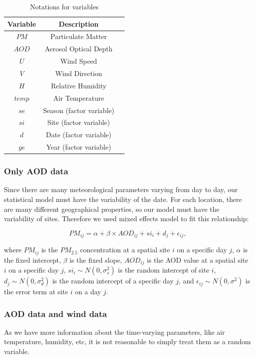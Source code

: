 \documentclass[10pt]{article}
\begin{document}
\begin{table}[H] 
\centering
\begin{tabular}{|c|c|c|}
\hline
Variable & Description \\ 
\hline
$PM$ & Particulate Matter \\
$AOD$ & Aerosol Optical Depth \\
$U$ & Wind Speed \\
$V$ & Wind Direction \\
$H$ & Relative Humidity \\
$temp$ & Air Temperature \\
$se$ & Season (factor variable)\\
$si$ & Site (factor variable)\\
$d$ & Date (factor variable)\\
$ye$ & Year (factor variable)\\
\hline
\end{tabular}
\caption{Notations for variables}
\label{variable_table}
\end{table}

\subsubsection{Only AOD data}
Since there are many meteorological parameters varying from day to day, our statistical model must have the variability of the date. For each location, there are many different geographical properties, so our model must have the variability of sites. Therefore we used mixed effects model to fit this relationship:

$$PM_{ij} = \alpha + \beta\times AOD_{ij} + si_i + d_j+ \epsilon_{ij}, $$

where $PM_{ij}$ is the $PM_{2.5}$ concentration at a spatial site $i$ on a specific day $j$, $\alpha$ is the fixed intercept, $\beta$ is the fixed slope, $AOD_{ij}$ is the AOD value at a spatial site $i$ on a specific day $j$, $si_i\sim N(0, \sigma_s^2)$ is the random intercept of site $i$, $d_j\sim N(0, \sigma_d^2)$ is the random intercept of a specific day $j$, and $\epsilon_{ij}\sim N(0, \sigma^2)$ is the error term at site $i$ on a day $j$.

\subsubsection{AOD data and wind data}
As we have more information about the time-varying parameters, like air temperature, humidity, etc, it is not reasonable to simply treat them as a random variable. 
\end{document}
